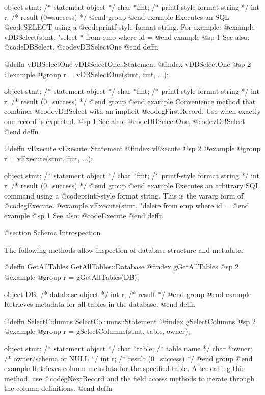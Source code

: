 object  stmt;   /*  statement object              */
char    *fmt;   /*  printf-style format string    */
int     r;      /*  result (0=success)            */
@end group
@end example
Executes an SQL @code{SELECT} using a @code{printf}-style format string.
For example:
@example
vDBSelect(stmt, "select * from emp where id = %
@end example
@sp 1
See also:  @code{DBSelect}, @code{vDBSelectOne}
@end deffn



@deffn {vDBSelectOne} vDBSelectOne::Statement
@findex vDBSelectOne
@sp 2
@example
@group
r = vDBSelectOne(stmt, fmt, ...);

object  stmt;   /*  statement object              */
char    *fmt;   /*  printf-style format string    */
int     r;      /*  result (0=success)            */
@end group
@end example
Convenience method that combines @code{vDBSelect} with an implicit
@code{gFirstRecord}.  Use when exactly one record is expected.
@sp 1
See also:  @code{DBSelectOne}, @code{vDBSelect}
@end deffn



@deffn {vExecute} vExecute::Statement
@findex vExecute
@sp 2
@example
@group
r = vExecute(stmt, fmt, ...);

object  stmt;   /*  statement object              */
char    *fmt;   /*  printf-style format string    */
int     r;      /*  result (0=success)            */
@end group
@end example
Executes an arbitrary SQL command using a @code{printf}-style format
string.  This is the vararg form of @code{gExecute}.
@example
vExecute(stmt, "delete from emp where id = %
@end example
@sp 1
See also:  @code{Execute}
@end deffn



@section Schema Introspection

The following methods allow inspection of database structure and metadata.


@deffn {GetAllTables} GetAllTables::Database
@findex gGetAllTables
@sp 2
@example
@group
r = gGetAllTables(DB);

object  DB;   /*  database object  */
int     r;    /*  result           */
@end group
@end example
Retrieves metadata for all tables in the database.
@end deffn



@deffn {SelectColumns} SelectColumns::Statement
@findex gSelectColumns
@sp 2
@example
@group
r = gSelectColumns(stmt, table, owner);

object  stmt;    /*  statement object        */
char    *table;  /*  table name              */
char    *owner;  /*  owner/schema or NULL    */
int     r;       /*  result (0=success)      */
@end group
@end example
Retrieves column metadata for the specified table.  After calling this
method, use @code{gNextRecord} and the field access methods to iterate
through the column definitions.
@end deffn



